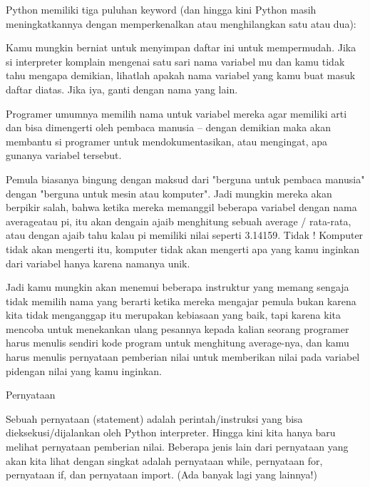 \vspace{12pt}
\noindent 
Python memiliki tiga puluhan keyword (dan hingga kini Python masih meningkatkannya dengan memperkenalkan atau menghilangkan satu atau dua): \par
\vspace{12pt}
\noindent 
Kamu mungkin berniat untuk menyimpan daftar ini untuk mempermudah. Jika si interpreter komplain mengenai satu sari nama variabel mu dan kamu tidak tahu mengapa demikian, lihatlah apakah nama variabel yang kamu buat masuk daftar diatas. Jika iya, ganti dengan nama yang lain. \par
\vspace{12pt}
\noindent 
Programer umumnya memilih nama untuk variabel mereka agar memiliki arti dan bisa dimengerti oleh pembaca manusia -- dengan demikian maka akan membantu si programer untuk mendokumentasikan, atau mengingat, apa gunanya variabel tersebut. \par
\vspace{12pt}
\vspace{12pt}
\noindent 
Pemula biasanya bingung dengan maksud dari "berguna untuk pembaca manusia" dengan "berguna untuk mesin atau komputer". Jadi mungkin mereka akan berpikir salah, bahwa ketika mereka memanggil beberapa variabel dengan nama $  $averageatau $  $pi, itu akan dengain ajaib menghitung sebuah average / rata-rata, atau dengan ajaib tahu kalau pi memiliki nilai seperti 3.14159. Tidak ! Komputer tidak akan mengerti itu, komputer tidak akan mengerti apa yang kamu inginkan dari variabel hanya karena namanya unik. \par
\vspace{12pt}
\noindent 
Jadi kamu mungkin akan menemui beberapa instruktur yang memang sengaja tidak memilih nama yang berarti ketika mereka mengajar pemula bukan karena kita tidak menganggap itu merupakan kebiasaan yang baik, tapi karena kita mencoba untuk menekankan ulang pesannya kepada kalian seorang programer  harus menulis sendiri kode program untuk menghitung average-nya, dan kamu harus menulis pernyataan pemberian nilai untuk memberikan nilai pada variabel $  $pidengan nilai yang kamu inginkan. \par
\vspace{12pt}
\noindent 
 Pernyataan \par
\vspace{12pt}
\noindent 
Sebuah $  $pernyataan $  $(statement) adalah perintah/instruksi yang bisa dieksekusi/dijalankan oleh Python interpreter. Hingga kini kita hanya baru melihat pernyataan pemberian nilai. Beberapa jenis lain dari pernyataan yang akan kita lihat dengan singkat adalah pernyataan $  $while, pernyataan $  $for, pernyataan $  $if, dan pernyataan $  $import. (Ada banyak lagi yang lainnya!) \par
